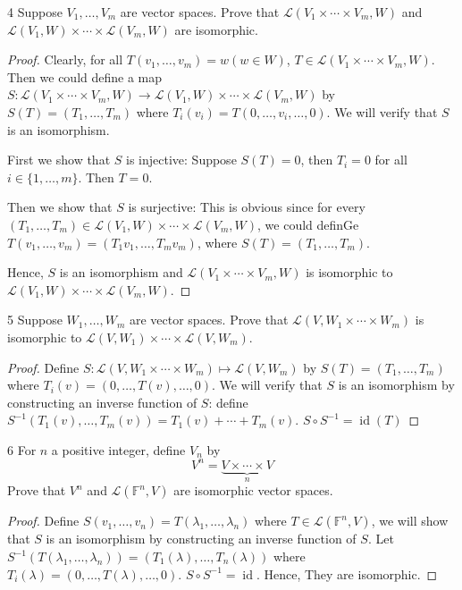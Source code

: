 \documentclass{article}
\newenvironment{problem}[1]{\begin{prob*}{#1}{}}{\end{prob*}}
\begin{document}
\begin{problem}{4}
Suppose $V_1, \ldots , V_m$ are vector spaces. Prove that $\mathcal{L}(V_1 \times \cdots\times V_m, W)$ and $\mathcal{L}(V_1, W) \times \cdots \times \mathcal{L}(V_m, W)$ are isomorphic.
\end{problem}
\begin{proof}
	Clearly, for all $T(v_1, \ldots ,v_m) = w (w\in W)$, $T \in \mathcal{L}(V_1 \times \cdots \times V_m, W)$. Then we could define a map $S: \mathcal{L}(V_1 \times \cdots \times V_m, W) \to \mathcal{L}(V_1, W) \times \cdots \times \mathcal{L}(V_m, W)$ by $S(T) = (T_1, \ldots ,T_m)$ where $T_i(v_i) = T(0, \ldots ,v_i , \ldots , 0)$. We will verify that $S$ is an isomorphism. \par
	First we show that $S$ is injective: Suppose $S(T) = 0$, then $T_i = 0$ for all $i \in \{1, \ldots ,m\}$. Then $T = 0$. \par
	Then we show that $S$ is surjective: This is obvious since for every $(T_1, \ldots , T_m) \in \mathcal{L}(V_1, W) \times \cdots \times \mathcal{L}(V_m, W)$, we could definGe $T(v_1, \ldots ,v_m) = (T_1v_1, \ldots ,T_mv_m)$, where $S(T) = (T_1, \ldots , T_m)$. \par
	Hence, $S$ is an isomorphism and $\mathcal{L}(V_1 \times \cdots\times V_m, W)$ is isomorphic to $\mathcal{L}(V_1, W) \times \cdots\times \mathcal{L}(V_m, W)$.
\end{proof}

\begin{problem}{5}
Suppose $W_1, \ldots , W_m$ are vector spaces. Prove that $\mathcal{L}(V, W_1 \times \cdots \times W_m)$ is isomorphic to $\mathcal{L}(V, W_1) \times \cdots \times \mathcal{L}(V, W_m)$.
\end{problem}
\begin{proof}
	Define $S: \mathcal{L}(V, W_1\times \cdots\times W_m) \mapsto \mathcal{L}(V,W_m)$ by $S(T) = (T_1, \ldots ,T_m)$ where $T_i(v) = (0, \ldots ,T(v), \ldots ,0)$. We will verify that $S$ is an isomorphism by constructing an inverse function of $S$: define
	$S^{-1} (T_1(v), \ldots , T_m(v)) = T_1(v) + \cdots + T_m(v)$. $S \circ S^{-1} = \operatorname{id}(T)$
\end{proof}

\begin{problem}{6}
For $n $ a positive integer, define $V_n $ by \[
	V^n = \underbrace{ V \times \cdots \times V }_{n}\]
Prove that $V^n$ and $\mathcal{L}(\mathbb{F}^n, V)$ are isomorphic vector spaces.
\end{problem}
\begin{proof}
	Define $S(v_1, \ldots ,v_n) = T(\lambda_1, \ldots , \lambda_n)$ where $T \in \mathcal{L}(\mathbb{F}^n, V)$, we will show that $S$ is an isomorphism by constructing an inverse function of $S$. Let $S^{-1} (T(\lambda_1, \ldots ,\lambda_n)) = (T_1(\lambda), \ldots , T_n(\lambda))$ where $T_i(\lambda) = (0, \ldots, T(\lambda), \ldots , 0)$. $S \circ S^{-1} = \operatorname{id}$. Hence, They are isomorphic.
\end{proof}
\end{document}
